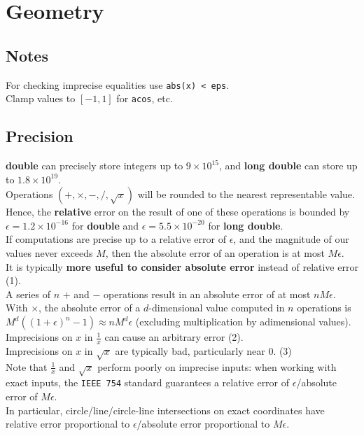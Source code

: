 \chapter{Geometry}

\section{Notes}
	For checking imprecise equalities use \texttt{abs(x) < eps}. \\
	Clamp values to $[-1, 1]$ for \texttt{acos}, etc.

\section{Precision}
	\textbf{double} can precisely store integers up to $9 \times 10^{15}$, and \textbf{long double} can store up to $1.8 \times 10^{19}$. \\	
	Operations $(+, \times, -, /, \sqrt{x})$ will be rounded to the nearest representable value. Hence, the \textbf{relative} error on the result of one of these operations is bounded by $\epsilon = 1.2 \times 10^{-16}$ for \textbf{double} and $\epsilon = 5.5 \times 10^{-20}$ for \textbf{long double}. \\
	If computations are precise up to a relative error of $\epsilon$, and the magnitude of our values never exceeds $M$, then the absolute error of an operation is at most $M \epsilon$. \\
	It is typically \textbf{more useful to consider absolute error} instead of relative error (1). \\

	A series of $n$ $+$ and $-$ operations result in an absolute error of at most $nM\epsilon$. \\
	With $\times$, the absolute error of a $d$-dimensional value computed in $n$ operations is $M^{d}((1+\epsilon)^{n}-1) \approx nM^{d}\epsilon$ (excluding multiplication by adimensional values). \\
	Imprecisions on $x$ in $\frac{1}{x}$ can cause an arbitrary error (2). \\
	Imprecisions on $x$ in $\sqrt{x}$ are typically bad, particularly near $0$. (3) \\

	Note that $\frac{1}{x}$ and $\sqrt{x}$ perform poorly on imprecise inputs: when working with exact inputs, the \texttt{IEEE 754} standard guarantees a relative error of $\epsilon$/absolute error of $M\epsilon$. \\ 
	In particular, circle/line/circle-line intersections on exact coordinates have relative error proportional to $\epsilon$/absolute error proportional to $M\epsilon$.

